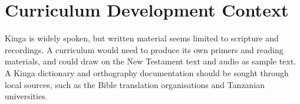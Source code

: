 \documentclass[12pt]{article}
\begin{document}
\section{Curriculum Development Context}
Kinga is widely spoken, but written material seems limited to scripture and recordings. A curriculum would need to produce its own primers and reading materials, and could draw on the New Testament text and audio as sample text. A Kinga dictionary and orthography documentation should be sought through local sources, such as the Bible translation organisations and Tanzanian universities.
\end{document}

